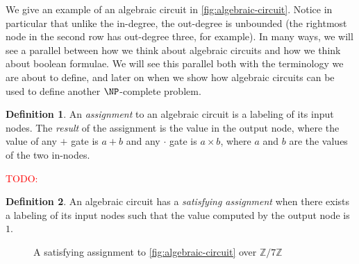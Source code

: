 \documentclass[english,12pt]{reedthesis}
\theoremstyle{plain}
\theoremstyle{definition}
\newtheorem{defn}[defn]{Definition}
\theoremstyle{remark}
\newcommand{\TODO}[1]{\textcolor{red}{TODO: #1}}
\begin{document}
We give an example of an algebraic circuit in \cref{fig:algebraic-circuit}.
Notice in particular that unlike the in-degree, the out-degree is unbounded (the
rightmost node in the second row has out-degree three, for example). In many
ways, we will see a parallel between how we think about algebraic circuits and
how we think about boolean formulae. We will see this parallel both with the
terminology we are about to define, and later on when we show how algebraic
circuits can be used to define another $\NP$-complete problem.

\begin{defn}\label{def:alg-assignment}
  An \emph{assignment} to an algebraic circuit is a labeling of its input nodes.
  The \emph{result} of the assignment is the value in the output node, where the
  value of any $+$ gate is $a+b$ and any $\cdot$ gate is $a \times b$, where $a$ and $b$
  are the values of the two in-nodes.
\end{defn}

\TODO{}

\begin{defn}\label{def:alg-circuit-sat}
  An algebraic circuit has a \emph{satisfying assignment} when there exists a
  labeling of its input nodes such that the value computed by the output node is
  $1$.
\end{defn}

\begin{figure}
  \begin{center}
  \end{center}
  \caption{A satisfying assignment to \cref{fig:algebraic-circuit} over $\mathbb{Z}/7\mathbb{Z}$}\label{fig:sat-assignment}
\end{figure}
\end{document}
